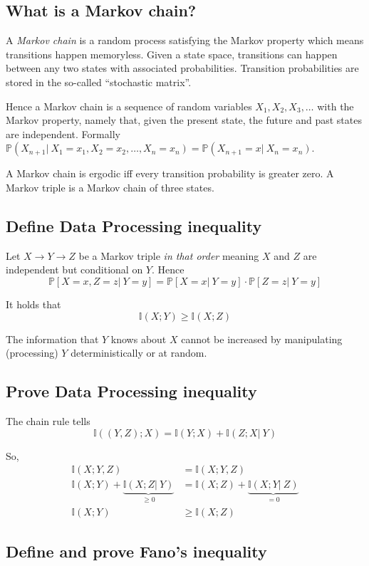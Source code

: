 \documentclass[a4paper]{article}
\newcommand\op[2][P]{\mathbb{#1}\left(#2\right)}
\newcommand\cond[3][P]{\mathbb{#1}\left(#2 \left|\:#3\right)\right.}
\newcommand\cons[3][P]{\mathbb{#1}\left[#2 \left|\:#3\right]\right.}
\newcommand\key[1]{\textit{#1}}
\theoremstyle{definition}
\begin{document}
\subsection{What is a Markov chain?}
%
A \key{Markov chain} is a random process satisfying the Markov property which means transitions happen memoryless.
Given a state space, transitions can happen between any two states with associated probabilities. Transition probabilities are stored in the so-called \enquote{stochastic matrix}.

Hence a Markov chain is a sequence of random variables $X_1, X_2, X_3, \dotsc$ with the Markov property, namely that, given the present state, the future and past states are independent. Formally $\cond{X_{n+1}}{X_1 = x_1, X_2 = x_2, \dotsc, X_n = x_n} = \cond{X_{n+1} = x}{X_n = x_n}$.

A Markov chain is ergodic iff every transition probability is greater zero. A Markov triple is a Markov chain of three states.

\subsection{Define Data Processing inequality}

Let $X \rightarrow Y \rightarrow Z$ be a Markov triple \emph{in that order} meaning $X$ and $Z$ are independent but conditional on $Y$. Hence
\[ \cons{X=x, Z=z}{Y=y} = \cons{X=x}{Y=y} \cdot \cons{Z=z}{Y=y} \]

It holds that
\[  \op[I]{X;Y} \geq \op[I]{X;Z}  \]

The information that $Y$ knows about $X$ cannot be increased by manipulating (processing) $Y$ deterministically or at random.

\subsection{Prove Data Processing inequality}

The chain rule tells
\[  \op[I]{(Y, Z); X} = \op[I]{Y;X} + \cond[I]{Z;X}{Y}  \]

So,
\begin{align*}
  \op[I]{X;Y,Z} &= \op[I]{X;Y,Z} \\
  \op[I]{X;Y} + \underbrace{\cond[I]{X;Z}{Y}}_{\geq0} &= \op[I]{X;Z} + \underbrace{\cond[I]{X;Y}{Z}}_{=0} \\
  \op[I]{X;Y} &\geq \op[I]{X;Z}
\end{align*}

\subsection{Define and prove Fano's inequality}
\end{document}

